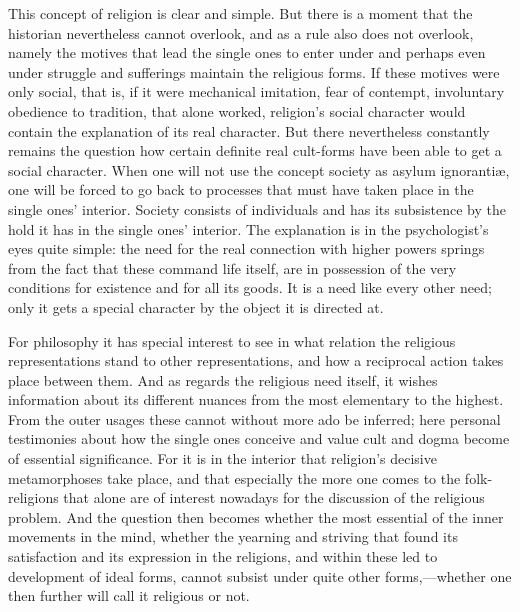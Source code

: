 \documentclass[12pt,a4paper]{book}
\newcommand{\opage}[1]{\marginnote{\footnotesize\textit{[#1]}}}
\begin{document}
\opage{372}This concept of religion is clear and simple. But there is a moment that the historian nevertheless
cannot overlook, and as a rule also does not overlook, namely the motives that lead the single ones to
enter under and perhaps even under struggle and sufferings maintain the religious forms. If these
motives were only social, that is, if it were mechanical imitation, fear of contempt, involuntary
obedience to tradition, that alone worked, religion's social character would contain the explanation of
its real character. But there nevertheless constantly remains the question how certain definite real
cult-forms have been able to get a social character. When one will not use the concept society as
asylum ignorantiæ, one will be forced to go back to processes that must have taken place in the single
ones' interior. Society consists of individuals and has its subsistence by the hold it has in the
single ones' interior. The explanation is in the psychologist's eyes quite simple: the need for the
real connection with higher powers springs from the fact that these command life itself, are in
possession of the very conditions for existence and for all its goods. It is a need like every other
need; only it gets a special character by the object it is directed at.

For philosophy it has special interest to see in what relation the religious representations stand to
other representations, and how a reciprocal action takes place between them. And as regards the
religious need itself, it wishes information about its different nuances from the most elementary to
the highest. From the outer usages these cannot without more ado be inferred; here personal testimonies
about how the single ones conceive and value cult and dogma become of essential significance. For it is
in the interior that religion's decisive metamorphoses take place, and that especially the more one
comes to the folk-religions that alone are of interest nowadays for the discussion of the religious
problem. And the question then becomes whether the most essential of the inner movements in the mind,
whether the yearning and striving that found its satisfaction and its expression in the \opage{373}religions, and
within these led to development of ideal forms, cannot subsist under quite other forms,---whether one
then further will call it religious or not.
\end{document}
